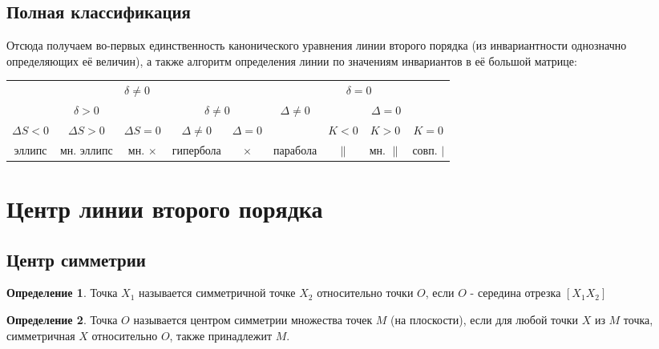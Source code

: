 \documentclass[a4paper, 12pt]{article}
\theoremstyle{definition}
\newtheorem*{definition}{Определение}
\begin{document}
	\subsection{Полная классификация}
	Отсюда получаем во-первых единственность канонического уравнения линии второго порядка (из инвариантности однозначно определяющих её величин), а также алгоритм определения линии по значениям инвариантов в её большой матрице:
	\begin{table}[htbp]
		\begin{tabular}{@{}ccccccccc@{}}
			\toprule
		\multicolumn{5}{c}{$\delta \neq 0$} & \multicolumn{4}{c}{$\delta = 0$} \\ \cmidrule(lr){1-5}\cmidrule(lr){6-9}
		\multicolumn{3}{c}{$\delta > 0$} & \multicolumn{2}{c}{$\delta \neq 0$} & $\Delta \neq 0$ & \multicolumn{3}{c}{$\Delta = 0$} \\ \cmidrule(lr){1-3}\cmidrule(lr){4-5}\cmidrule{7-9}
		$\Delta S < 0$ & $\Delta S > 0$ & $\Delta S = 0$ & $\Delta \neq 0$ & $\Delta = 0$ &  & $K < 0$ & $K > 0$ & $K = 0$ \\ \cmidrule(lr){1-1}\cmidrule(lr){2-2}\cmidrule{3-3}\cmidrule(lr){4-4}\cmidrule(lr){5-5}\cmidrule{6-6}\cmidrule(lr){7-7}\cmidrule(lr){8-8}\cmidrule{9-9}
		эллипс&мн. эллипс&мн. $\times$&гипербола&$\times$&парабола&$\parallel$&мн. $\parallel$& совп. $|$ \\\bottomrule
		\end{tabular}
	\end{table} 
	\section{Центр линии второго порядка}
	\subsection{Центр симметрии}
	\begin{definition}
		Точка $X_1$ называется симметричной точке $X_2$ относительно точки $O$, если $O$ - середина отрезка $[X_1 X_2]$
	\end{definition}
	\begin{definition}
		Точка $O$ называется центром симметрии множества точек $M$ (на плоскости), если для любой точки $X$ из $M$ точка, симметричная $X$ относительно $O$, также принадлежит $M$. 
	\end{definition}
\end{document}
